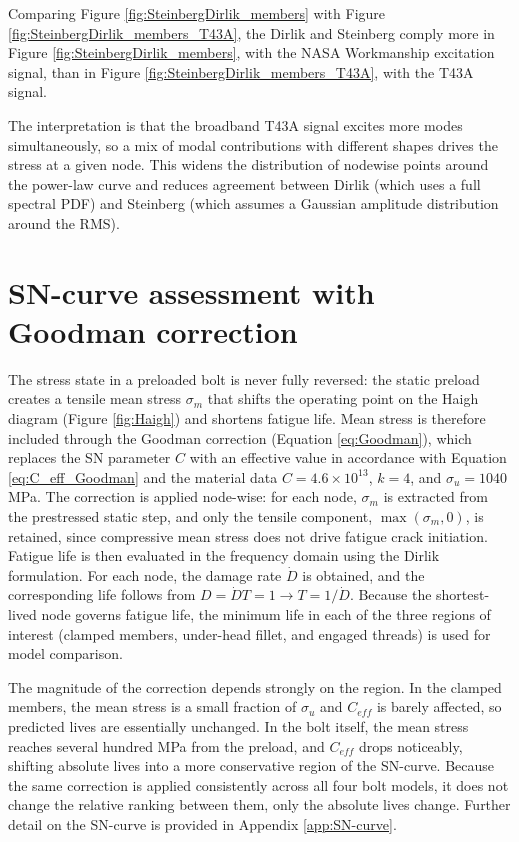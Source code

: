 \documentclass[a4paper,twoside]{bth}
\begin{document}
Comparing Figure \ref{fig:SteinbergDirlik_members} with Figure \ref{fig:SteinbergDirlik_members_T43A}, the Dirlik and Steinberg comply more in Figure \ref{fig:SteinbergDirlik_members}, with the NASA Workmanship excitation signal, than in Figure \ref{fig:SteinbergDirlik_members_T43A}, with the T43A signal.

The interpretation is that the broadband T43A signal excites more modes simultaneously, so a mix of modal contributions with different shapes drives the stress at a given node. This widens the distribution of nodewise points around the power-law curve and reduces agreement between Dirlik (which uses a full spectral \ac{PDF}) and Steinberg (which assumes a Gaussian amplitude distribution around the RMS).

\section{SN-curve assessment with Goodman correction}

The stress state in a preloaded bolt is never fully reversed: the static preload creates a tensile mean stress $\sigma_m$ that shifts the operating point on the Haigh diagram (Figure \ref{fig:Haigh}) and shortens fatigue life. Mean stress is therefore included through the Goodman correction (Equation \ref{eq:Goodman}), which replaces the SN parameter $C$ with an effective value in accordance with Equation \ref{eq:C_eff_Goodman} and the material data $C = 4.6 \times 10^{13}$, $k = 4$, and $\sigma_u = 1040$ MPa. The correction is applied node-wise: for each node, $\sigma_m$ is extracted from the prestressed static step, and only the tensile component, $\max(\sigma_m, 0)$, is retained, since compressive mean stress does not drive fatigue crack initiation. Fatigue life is then evaluated in the frequency domain using the Dirlik formulation. For each node, the damage rate $\dot{D}$ is obtained, and the corresponding life follows from $D = \dot{D}T = 1 \rightarrow T = 1/\dot{D}$. Because the shortest-lived node governs fatigue life, the minimum life in each of the three regions of interest (clamped members, under-head fillet, and engaged threads) is used for model comparison.

The magnitude of the correction depends strongly on the region. In the clamped members, the mean stress is a small fraction of $\sigma_u$ and $C_{eff}$ is barely affected, so predicted lives are essentially unchanged. In the bolt itself, the mean stress reaches several hundred MPa from the preload, and $C_{eff}$ drops noticeably, shifting absolute lives into a more conservative region of the SN-curve. Because the same correction is applied consistently across all four bolt models, it does not change the relative ranking between them, only the absolute lives change. Further detail on the SN-curve is provided in Appendix \ref{app:SN-curve}.
\end{document}
